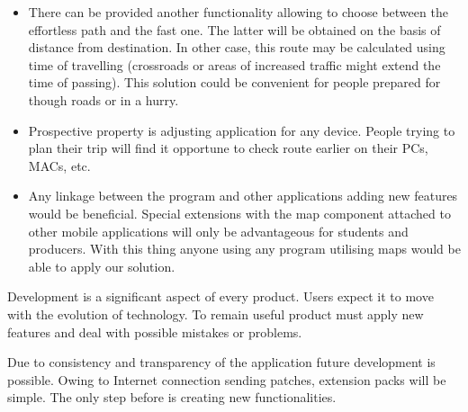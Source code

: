 \documentclass[12pt]{article}
\begin{document}
\begin{itemize}
	\item There can be provided another functionality allowing to choose between the effortless path and the fast one.
	The latter will be obtained on the basis of distance from destination.
	In other case, this route may be calculated using time of travelling (crossroads or areas of increased traffic might extend the time of passing).
	This solution could be convenient for people prepared for though roads or in a hurry.
	
	\item Prospective property is adjusting application for any device.
	People trying to plan their trip will find it opportune to check route earlier on their PCs, MACs, etc.
	
	\item Any linkage between the program and other applications adding new features would be beneficial.
	Special extensions with the map component attached to other mobile applications will only be advantageous for students and producers.
	With this thing anyone using any program utilising maps would be able to apply our solution.
\end{itemize}

Development is a significant aspect of every product.
Users expect it to move with the evolution of technology.
To remain useful product must apply new features and deal with possible mistakes or problems.

Due to consistency and transparency of the application future development is possible.
Owing to Internet connection sending patches, extension packs will be simple.
The only step before is creating new functionalities.

\newpage
\listoffigures
\end{document}
